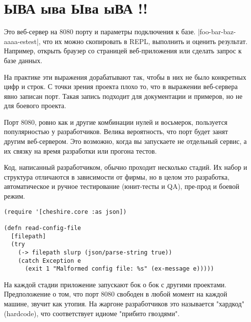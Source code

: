 \chapter{ЫВА ыва Ыва ыВА !!}


Это веб-сервер на 8080 порту и параметры подключения к базе.
\spverb|foo-bar-baz-aaaa-estest|, что их можно скопировать в REPL, выполнить и оценить
результат. Например, открыть браузер со страницей веб-приложения или сделать
запрос к базе данных.

На практике эти выражения дорабатывают так, чтобы в них не было конкретных цифр
и строк. С точки зрения проекта плохо то, что в выражении веб-сервера явно
записан порт. Такая запись подходит для документации и примеров, но не для
боевого проекта.

Порт 8080, ровно как и другие комбинации нулей и восьмерок, пользуется
популярностью у разработчиков. Велика вероятность, что порт будет занят другим
веб-сервером. Это возможно, когда вы запускаете не отдельный сервис, а их связку
на время разработки или прогона тестов.

Код, написанный разработчиком, обычно проходит несколько стадий. Их набор и
структура отличаются в зависимости от фирмы, но в целом это разработка,
автоматическое и ручное тестирование (юнит-тесты и QA), пре-прод и боевой режим.



\begin{sloppypar}
\begin{verbatim}
(require '[cheshire.core :as json])

(defn read-config-file
  [filepath]
  (try
    (-> filepath slurp (json/parse-string true))
    (catch Exception e
      (exit 1 "Malformed config file: %s" (ex-message e)))))
\end{verbatim}
\end{sloppypar}


На каждой стадии приложение запускают бок о бок с другими
проектами. Предположение о том, что порт 8080 свободен в любой момент на каждой
машине, звучит как утопия. На жаргоне разработчиков это называется "хардкод"
(hardcode), что соответствует идиоме "прибито гвоздями".






